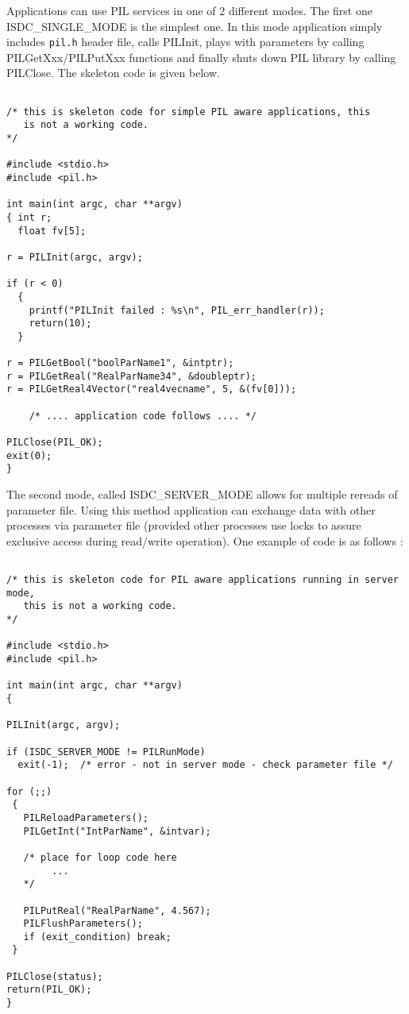 Applications can use PIL services in one of 2 different modes. The first one
ISDC\_SINGLE\_MODE is the simplest
one. In this mode application simply includes {\tt pil.h} header file, calls
PILInit, plays with parameters by calling
PILGetXxx/PILPutXxx functions and finally shuts down PIL library by calling
PILClose. The skeleton code is given
below. 

\begin{verbatim}

/* this is skeleton code for simple PIL aware applications, this
   is not a working code.
*/

#include <stdio.h>
#include <pil.h>

int main(int argc, char **argv)
{ int r;
  float	fv[5];

r = PILInit(argc, argv);

if (r < 0)
  {
    printf("PILInit failed : %s\n", PIL_err_handler(r));
    return(10);
  }

r = PILGetBool("boolParName1", &intptr);
r = PILGetReal("RealParName34", &doubleptr);
r = PILGetReal4Vector("real4vecname", 5, &(fv[0]));

    /* .... application code follows .... */

PILClose(PIL_OK);
exit(0);
} 

\end{verbatim}

The second mode, called ISDC\_SERVER\_MODE allows for multiple rereads of
parameter file. Using this method
application can exchange data with other processes via parameter file
(provided other processes use locks to
assure exclusive access during read/write operation). One example of code is
as follows : 

\begin{verbatim}

/* this is skeleton code for PIL aware applications running in server mode,
   this is not a working code.
*/

#include <stdio.h>
#include <pil.h>

int main(int argc, char **argv)
{

PILInit(argc, argv);

if (ISDC_SERVER_MODE != PILRunMode)
  exit(-1);  /* error - not in server mode - check parameter file */

for (;;)
 {
   PILReloadParameters();
   PILGetInt("IntParName", &intvar);

   /* place for loop code here
        ...
   */

   PILPutReal("RealParName", 4.567);
   PILFlushParameters();
   if (exit_condition) break;
 }

PILClose(status);
return(PIL_OK);
}

\end{verbatim}

